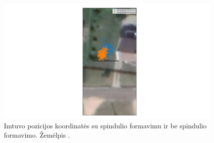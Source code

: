\documentclass[main.tex]{subfiles}
\begin{document}
\begin{figure}[ht]
    \begin{centering}
    \hspace*{-4cm}\includegraphics[scale=0.5]{drawings/one_reflection_map}
    \par\end{centering}
    \protect\caption{\label{fig:single_reflection_map}Imtuvo pozicijos koordinatės su spindulio formavimu ir be spindulio formavimo. Žemėlpis \cite{google_maps}.}
\end{figure}
\end{document}
